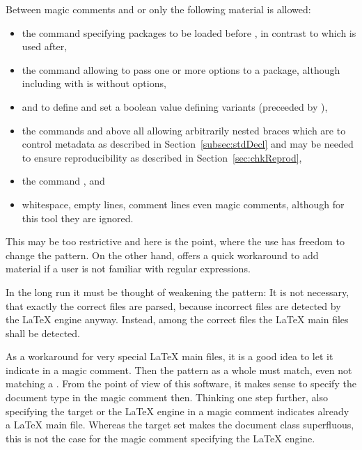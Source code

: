 Between magic comments and 
 or  
only the following material is allowed: 
%
\begin{itemize}
\item
the command  specifying packages to be loaded 
before , 
in contrast to  which is used after, 
\item
the command  
allowing to pass one or more options to a package, 
although including with  is without options, 
\item 
{} and  to define and set a boolean value 
defining variants (preceeded by ), 
\item 
the commands  and above all  allowing arbitrarily nested braces 
which are to control metadata as described in Section~\ref{subsec:stdDecl} and may be needed to ensure reproducibility 
as described in Section~\ref{sec:chkReprod}, %
\item
the command , and 
\item
whitespace, empty lines, comment lines even magic comments, 
although for this tool they are ignored. 
\end{itemize}
%
This may be too restrictive and here is the point, 
where the use has freedom to change the pattern. 
On the other hand,  offers a quick workaround 
to add material if a user is not familiar with regular expressions. 

In the long run it must be thought of weakening the pattern: 
It is not necessary, that exactly the correct files are parsed, 
because incorrect files are detected by the \LaTeX{} engine anyway. 
Instead, among the correct files the \LaTeX{} main files shall be detected. 

As a workaround for very special \LaTeX{} main files, 
it is a good idea to let it indicate in a magic comment. 
Then the pattern as a whole must match, even not matching a . 
From the point of view of this software, 
it makes sense to specify the document type in the magic comment then. 
Thinking one step further, also specifying the target 
or the \LaTeX{} engine in a magic comment 
indicates already a \LaTeX{} main file. 
Whereas the target set makes the document class superfluous, 
this is not the case for the magic comment specifying the \LaTeX{} engine. 



